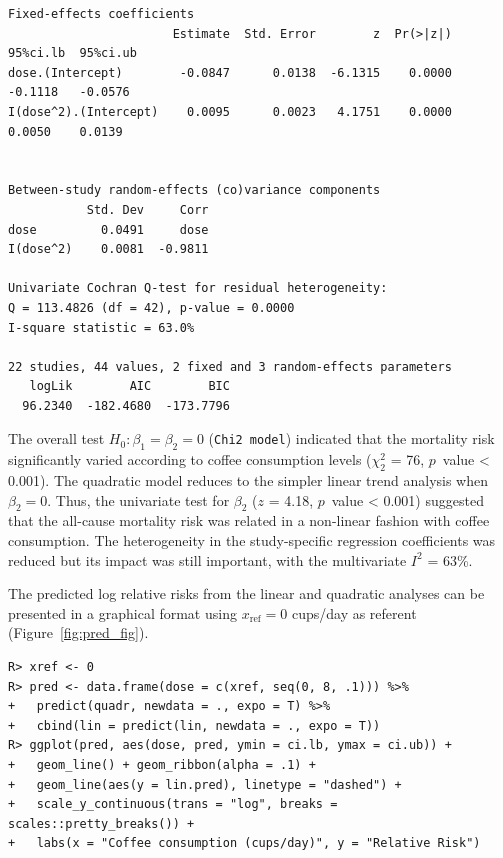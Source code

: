 \documentclass[11pt,a4paper,twoside,openany]{book}\usepackage{knitr}
\begin{document}
{{\begin{knitrout}
\begin{kframe}
\begin{verbatim}
Fixed-effects coefficients
                       Estimate  Std. Error        z  Pr(>|z|)  95%ci.lb  95%ci.ub
dose.(Intercept)        -0.0847      0.0138  -6.1315    0.0000   -0.1118   -0.0576
I(dose^2).(Intercept)    0.0095      0.0023   4.1751    0.0000    0.0050    0.0139


Between-study random-effects (co)variance components
           Std. Dev     Corr
dose         0.0491     dose
I(dose^2)    0.0081  -0.9811

Univariate Cochran Q-test for residual heterogeneity:
Q = 113.4826 (df = 42), p-value = 0.0000
I-square statistic = 63.0%

22 studies, 44 values, 2 fixed and 3 random-effects parameters
   logLik        AIC        BIC  
  96.2340  -182.4680  -173.7796  
\end{verbatim}
\end{kframe}
\end{knitrout}

\noindent The overall test $H_0: \beta_1 = \beta_2 = 0$ (\texttt{Chi2 model}) indicated that the mortality risk significantly varied according to coffee consumption levels ($\chi_2^2$ = 76, $p$~value < 0.001). The quadratic model reduces to the simpler linear trend analysis when $\beta_2 = 0$. Thus, the univariate test for $\beta_2$ ($z$ = 4.18, $p$~value < 0.001) suggested that the all-cause mortality risk was related in a non-linear fashion with coffee consumption. The heterogeneity in the study-specific regression coefficients was reduced but its impact was still important, with the multivariate $I^2$ = 63\%. 

\noindent The predicted log relative risks from the linear and quadratic analyses can be presented in a graphical format using $x_\mathrm{ref} = 0$ cups/day as referent (Figure~\ref{fig:pred_fig}).

\begin{knitrout}\footnotesize
{}\color{fgcolor}\begin{kframe}
\begin{verbatim}
R> xref <- 0
R> pred <- data.frame(dose = c(xref, seq(0, 8, .1))) %>%
+   predict(quadr, newdata = ., expo = T) %>%
+   cbind(lin = predict(lin, newdata = ., expo = T))
R> ggplot(pred, aes(dose, pred, ymin = ci.lb, ymax = ci.ub)) +
+   geom_line() + geom_ribbon(alpha = .1) +
+   geom_line(aes(y = lin.pred), linetype = "dashed") +
+   scale_y_continuous(trans = "log", breaks = scales::pretty_breaks()) +
+   labs(x = "Coffee consumption (cups/day)", y = "Relative Risk")
\end{verbatim}
\end{kframe}\begin{figure}[ht!]


\end{figure}
\end{knitrout}}}
\end{document}
